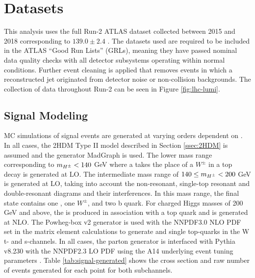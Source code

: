 	\section{Datasets}\label{sec:datasets}
		This analysis uses the full Run-2 ATLAS dataset collected between 2015 and 2018 corresponding to $139.0 \pm 2.4$ \ifb \cite{lumi-run2}. The datasets used are required to be included in the ATLAS ``Good Run Lists'' (GRLs), meaning they have passed nominal data quality checks with all detector subsystems operating within normal conditions. Further event cleaning is applied that removes events in which a reconstructed jet originated from detector noise or non-collision backgrounds. The collection of data throughout Run-2 can be seen in Figure \ref{fig:lhc-lumi}.

		\subsection{Signal Modeling}\label{ssec:sig-modeling}
		\gls{MC} simulations of \Hpm signal events are generated at varying orders dependent on \mHpm. In all cases, the 2HDM Type II model described in Section \ref{ssec:2HDM} is assumed and the generator MadGraph is used. The lower mass range corresponding to $m_{H^{\pm}} < 140$ GeV where a \Hpm takes the place of a $W^{\pm}$ in a top decay is generated at LO. The intermediate mass range of $140 \leq m_{H^{\pm}} < 200 $ GeV is generated at LO, taking into account the non-resonant, single-top resonant and double-resonant diagrams and their interferences. In this mass range, the final state contains one \Hpm, one $W^{\pm}$, and two b quark. For charged Higgs masses of 200 GeV and above, the \Hpm is produced in association with a top quark and is generated at NLO. The Powheg-box v2 \cites{powheg-1}{powheg-2} generator is used with the NNPDF3.0 \gls{NLO} \gls{PDF} \cite{PDFs-2} set in the matrix element calculations to generate \ttbar and single top-quarks in the W t- and s-channels. In all cases, the parton generator is interfaced with Pythia v8.230 \cite{pythia} with the NNPDF2.3 \gls{LO} \gls{PDF} \cite{PDFs-1} using the A14 underlying event tuning parameters \cite{Pythia8-tunes}. Table \ref{tab:signal-generated} shows the cross section and raw number of events generated for each \mHpm point for both subchannels.

